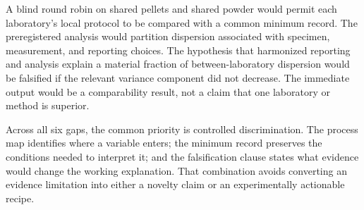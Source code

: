 A blind round robin on shared pellets and shared powder would permit each laboratory's local protocol to be compared with a common minimum record. The preregistered analysis would partition dispersion associated with specimen, measurement, and reporting choices. The hypothesis that harmonized reporting and analysis explain a material fraction of between-laboratory dispersion would be falsified if the relevant variance component did not decrease. The immediate output would be a comparability result, not a claim that one laboratory or method is superior.

Across all six gaps, the common priority is controlled discrimination. The process map identifies where a variable enters; the minimum record preserves the conditions needed to interpret it; and the falsification clause states what evidence would change the working explanation. That combination avoids converting an evidence limitation into either a novelty claim or an experimentally actionable recipe.
